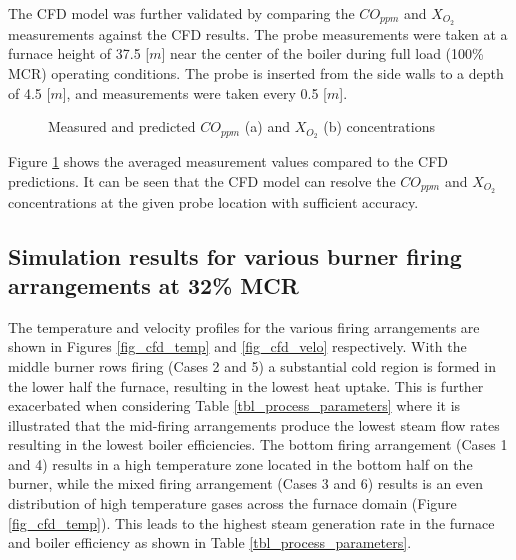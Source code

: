 \documentclass[review]{elsarticle}
\begin{document}
The CFD model was further validated by comparing the $CO_{ppm}$ and $X_{O_{2}}$ measurements against the CFD results. The probe measurements were taken at a furnace height of 37.5 [$m$] near the center of the boiler during full load (100\% MCR) operating conditions. The probe is inserted from the side walls to a depth of 4.5 [$m$], and measurements were taken every 0.5 [$m$].\\
\begin{figure}[h!]
\centering
{}
\hspace{5mm}
\caption{Measured and predicted $CO_{ppm}$ (a) and $X_{O_{2}}$ (b) concentrations}
\label{fig_probe_valid}
\end{figure}

Figure \ref{fig_probe_valid} shows the averaged measurement values compared to the CFD predictions. It can be seen that the CFD model can resolve the $CO_{ppm}$ and $X_{O_{2}}$ concentrations at the given probe location with sufficient accuracy.
\newpage
\subsection{Simulation results for various burner firing arrangements at 32\% MCR }
The temperature and velocity profiles for the various firing arrangements are shown in Figures \ref{fig_cfd_temp} and \ref{fig_cfd_velo} respectively. With the middle burner rows firing (Cases 2 and 5) a substantial cold region is formed in the lower half the furnace, resulting in the lowest heat uptake. This is further exacerbated when considering Table \ref{tbl_process_parameters} where it is illustrated that the mid-firing arrangements produce the lowest steam flow rates resulting in the lowest boiler efficiencies. The bottom firing arrangement (Cases 1 and 4) results in a high temperature zone located in the bottom half on the burner, while the mixed firing arrangement (Cases 3 and 6) results is an even distribution of high temperature gases across the furnace domain (Figure \ref{fig_cfd_temp}). This leads to the highest steam generation rate in the furnace and boiler efficiency as shown in Table \ref{tbl_process_parameters}.
\end{document}

